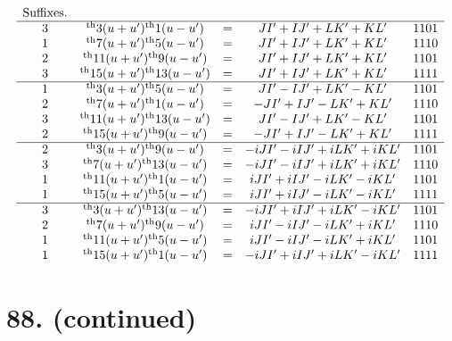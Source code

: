 \documentclass[11pt,a4paper]{book}
\providecommand{\uth}{\textsuperscript{th}}
\begin{document}
\[
\begin{array}{ccccc}
\text{Suffixes.} & & & & \\
\hline
3 & \uth{3}(u+u')\uth{1}(u-u') &=& JI' + IJ' + LK' + KL' & 1101 \\
1 & \uth{7}(u+u')\uth{5}(u-u') &=& JI' + IJ' + LK' + KL' & 1110 \\
2 & \uth{11}(u+u')\uth{9}(u-u') &=& JI' + IJ' + LK' + KL' & 1101 \\
3 & \uth{15}(u+u')\uth{13}(u-u') &=& JI' + IJ' + LK' + KL' & 1111 \\
\hline
1 & \uth{3}(u+u')\uth{5}(u-u') &=& JI' - IJ' + LK' - KL' & 1101 \\
2 & \uth{7}(u+u')\uth{1}(u-u') &=& -JI' + IJ' - LK' + KL' & 1110 \\
3 & \uth{11}(u+u')\uth{13}(u-u') &=& JI' - IJ' + LK' - KL' & 1101 \\
2 & \uth{15}(u+u')\uth{9}(u-u') &=& -JI' + IJ' - LK' + KL' & 1111 \\
\hline
2 & \uth{3}(u+u')\uth{9}(u-u') &=& -iJI' - iIJ' + iLK' + iKL' & 1101 \\
3 & \uth{7}(u+u')\uth{13}(u-u') &=& -iJI' - iIJ' + iLK' + iKL' & 1110 \\
1 & \uth{11}(u+u')\uth{1}(u-u') &=& iJI' + iIJ' - iLK' - iKL' & 1101 \\
1 & \uth{15}(u+u')\uth{5}(u-u') &=& iJI' + iIJ' - iLK' - iKL' & 1111 \\
\hline
3 & \uth{3}(u+u')\uth{13}(u-u') &=& -iJI' + iIJ' + iLK' - iKL' & 1101 \\
2 & \uth{7}(u+u')\uth{9}(u-u') &=& iJI' - iIJ' - iLK' + iKL' & 1110 \\
1 & \uth{11}(u+u')\uth{5}(u-u') &=& iJI' - iIJ' - iLK' + iKL' & 1101 \\
1 & \uth{15}(u+u')\uth{1}(u-u') &=& -iJI' + iIJ' + iLK' - iKL' & 1111
\end{array}
\]

\newpage
\section*{88. (continued)}
\label{sec:88cont2}
\end{document}
